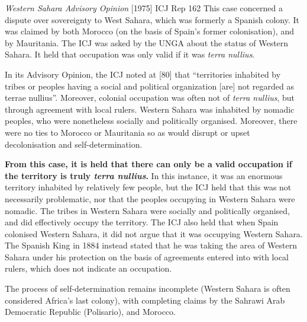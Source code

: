 \begin{casedetails}{\textit{Western Sahara Advisory Opinion} [1975] ICJ Rep 162}
    \flushleft
    This case concerned a dispute over sovereignty to West Sahara, which was formerly a Spanish colony. It was claimed by both Morocco (on the basis of Spain's former colonisation), and by Mauritania. The ICJ was asked by the UNGA about the status of Western Sahara. It held that occupation was only valid if it was \textit{terra nullius}.

    \vspace{\baselineskip}

    In its Advisory Opinion, the ICJ noted at [80] that ``territories inhabited by tribes or peoples having a social and political organization [are] not regarded as terrae nullius''. Moreover, colonial occupation was often not of \textit{terra nullius}, but through agreement with local rulers. Western Sahara was inhabited by nomadic peoples, who were nonetheless socially and politically organised. Moreover, there were no ties to Morocco or Mauritania so as would disrupt or upset decolonisation and self-determination.

    \vspace{\baselineskip}

    \textbf{From this case, it is held that there can only be a valid occupation if the territory is truly \textit{terra nullius}.} In this instance, it was an enormous territory inhabited by relatively few people, but the ICJ held that this was not necessarily problematic, nor that the peoples occupying in Western Sahara were nomadic. The tribes in Western Sahara were socially and politically organised, and did effectively occupy the territory. The ICJ also held that when Spain colonised Western Sahara, it did not argue that it was occupying Western Sahara. The Spanish King in 1884 instead stated that he was taking the area of Western Sahara under his protection on the basis of agreements entered into with local rulers, which does not indicate an occupation.

    \vspace{\baselineskip}

    The process of self-determination remains incomplete (Western Sahara is often considered Africa's last colony), with completing claims by the Sahrawi Arab Democratic Republic (Polisario), and Morocco.
\end{casedetails}

